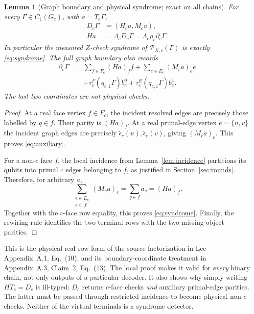 \documentclass[11pt]{article}
\theoremstyle{definition}
\theoremstyle{plain}
\newtheorem{lemma}[definition]{Lemma}
\theoremstyle{remark}
\newcommand{\eps}{\epsilon}
\begin{document}
\begin{lemma}[Graph boundary and physical syndrome; exact on all chains]
\label{lem:syndrome}
For every $\Gamma\in C_1(G_c)$, with $a=T_c\Gamma$,
\begin{align}
 D_c\Gamma&=(H_ca,M_ca),\label{eq:auxiliary}\\
 Ha&=\Lambda_cD_c\Gamma=\Lambda_c\rho_c\partial_c\Gamma .
                                                        \label{eq:syndrome}
\end{align}
In particular the measured $Z$-check syndrome of
$\mathscr P_{X,c}(\Gamma)$ is exactly \eqref{eq:syndrome}.
The full graph boundary also records
\begin{align*}
 \partial_c\Gamma={}&
 \sum_{f\in F_c}(Ha)_f f+\sum_{e\in E_c}(M_ca)_e e\\
 &+\tau_c^F(q_{c,1}\Gamma)b_c^0
   +\tau_c^E(q_{c,1}\Gamma)b_c^1 .
\end{align*}
The last two coordinates are not physical checks.
\end{lemma}
\begin{proof}
At a real face vertex $f\in F_c$, the incident resolved edges are
precisely those labelled by $q\in f$. Their parity is $(Ha)_f$.
At a real primal-edge vertex $e=\{u,v\}$ the incident graph edges
are precisely $\widetilde\eps_c(u),\widetilde\eps_c(v)$,
giving $(M_ca)_e$. This proves \eqref{eq:auxiliary}.

For a non-$c$ face $f$, the local incidence from
Lemma~\ref{lem:incidence} partitions its qubits into primal $c$
edges belonging to $f$, as justified in Section~\ref{sec:rounds}.
Therefore, for arbitrary $a$,
\[
 \sum_{\substack{e\in E_c\\e\subset f}}(M_ca)_e
       =\sum_{q\in f}a_q=(Ha)_f .
\]
Together with the $c$-face row equality, this proves
\eqref{eq:syndrome}. Finally, the rewiring rule identifies the two
terminal rows with the two missing-object parities.
\end{proof}

This is the physical real-row form of the source factorization in
Lee Appendix~A.1, Eq.~(10), and its boundary-coordinate treatment in
Appendix~A.3, Claim~2, Eq.~(13). The local proof makes it valid for
\emph{every} binary chain, not only outputs of a particular decoder.
It also shows why simply writing $HT_c=D_c$ is ill-typed: $D_c$
returns $c$-face checks \emph{and} auxiliary primal-edge parities.
The latter must be passed through restricted incidence to become
physical non-$c$ checks. Neither of the virtual terminals is a
syndrome detector.
\end{document}
